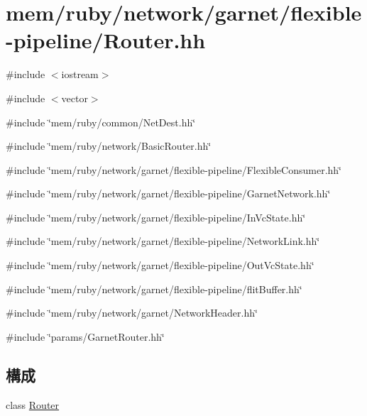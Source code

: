 \hypertarget{Router_8hh}{
\section{mem/ruby/network/garnet/flexible-\/pipeline/Router.hh}
\label{Router_8hh}
}
{\ttfamily \#include $<$iostream$>$}\par
{\ttfamily \#include $<$vector$>$}\par
{\ttfamily \#include \char`\"{}mem/ruby/common/NetDest.hh\char`\"{}}\par
{\ttfamily \#include \char`\"{}mem/ruby/network/BasicRouter.hh\char`\"{}}\par
{\ttfamily \#include \char`\"{}mem/ruby/network/garnet/flexible-\/pipeline/FlexibleConsumer.hh\char`\"{}}\par
{\ttfamily \#include \char`\"{}mem/ruby/network/garnet/flexible-\/pipeline/GarnetNetwork.hh\char`\"{}}\par
{\ttfamily \#include \char`\"{}mem/ruby/network/garnet/flexible-\/pipeline/InVcState.hh\char`\"{}}\par
{\ttfamily \#include \char`\"{}mem/ruby/network/garnet/flexible-\/pipeline/NetworkLink.hh\char`\"{}}\par
{\ttfamily \#include \char`\"{}mem/ruby/network/garnet/flexible-\/pipeline/OutVcState.hh\char`\"{}}\par
{\ttfamily \#include \char`\"{}mem/ruby/network/garnet/flexible-\/pipeline/flitBuffer.hh\char`\"{}}\par
{\ttfamily \#include \char`\"{}mem/ruby/network/garnet/NetworkHeader.hh\char`\"{}}\par
{\ttfamily \#include \char`\"{}params/GarnetRouter.hh\char`\"{}}\par
\subsection*{構成}
\begin{DoxyCompactItemize}
\item 
class \hyperlink{classRouter}{Router}
\end{DoxyCompactItemize}
